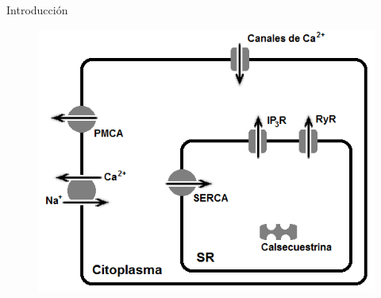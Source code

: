 \begin{frame}{Introducción}
	
	\begin{figure}[h]
		\includegraphics[width=.9\textwidth]{ElementosCa}
	\end{figure}
	
\end{frame}
